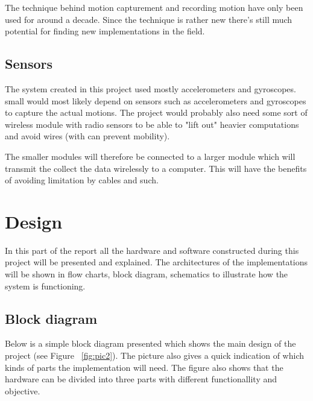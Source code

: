 \documentclass[a4paper, 12pt]{article}
\begin{document}
The technique behind motion capturement and recording motion have only been used for around a decade. Since the technique is rather new there's still much potential for finding new implementations in the field.
 

    

  
\subsection*{Sensors}
The system created in this project used mostly accelerometers and gyroscopes.  small   would most likely depend on sensors such as accelerometers and gyroscopes to capture the actual motions. The project would probably also need some sort of wireless module with radio sensors to be able to "lift out" heavier computations and avoid wires (with can prevent mobility). 

The smaller modules will therefore be connected to a larger module which will transmit the collect the data wirelessly to a computer. This will have the benefits of avoiding limitation by cables and such. 


\section*{Design}
In this part of the report all the hardware and software constructed during this project will be presented and explained. The architectures of the implementations will be shown in flow charts, block diagram, schematics to illustrate how the system is functioning.  

\subsection*{Block diagram}
Below is a simple block diagram presented which shows the main design of the project (see Figure ~\ref{fig:pic2}). The picture also gives a quick indication of which kinds of parts the implementation will need. The figure also shows that the hardware can be divided into three parts with different functionallity and objective.    
 
\end{document}
